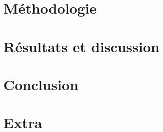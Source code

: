 \documentclass[10pt,letterpaper,twocolumn]{article}
\begin{document}
\section{Méthodologie}\label{sec:metho} %


\section{Résultats et discussion}\label{sec:resultats} %


\section{Conclusion}\label{sec:conclusion} %

\section{Extra} %

\printbibliography
% 
%
\end{document}

